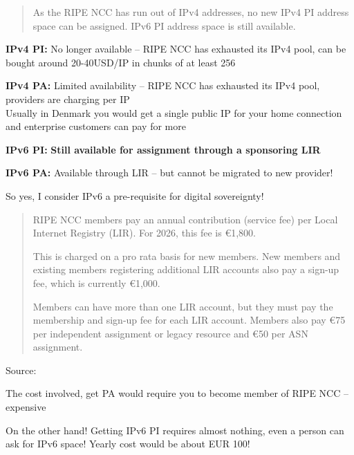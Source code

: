 \documentclass[Screen16to9,17pt]{foils}
\begin{document}

\begin{quote}
As the RIPE NCC has run out of IPv4 addresses, no new IPv4 PI address space can be
assigned. IPv6 PI address space is still available.
\end{quote}

\begin{list2}
  \item {\bf IPv4 PI:} No longer available -- RIPE NCC has exhausted its IPv4 pool, can be bought around 20-40USD/IP in chunks of at least 256
  \item {\bf IPv4 PA:} Limited availability -- RIPE NCC has exhausted its IPv4 pool, providers are charging per IP\\
  Usually in Denmark you would get a single public IP for your home connection and enterprise customers can pay for more
  \item {\bf IPv6 PI:} {\bf Still available for assignment through a sponsoring LIR}
  \item {\bf IPv6 PA:} Available through LIR -- but cannot be migrated to new provider!
\end{list2}

So yes, I consider IPv6 a pre-requisite for digital sovereignty!


\begin{quote}
RIPE NCC members pay an annual contribution (service fee) per Local Internet Registry (LIR). For 2026, this fee is €1,800.

This is charged on a pro rata basis for new members. New members and existing members registering additional LIR accounts also pay a sign-up fee, which is currently €1,000.

Members can have more than one LIR account, but they must pay the membership and sign-up fee for each LIR account. Members also pay €75 per independent assignment or legacy resource and €50 per ASN assignment.
\end{quote}
Source: 

\begin{list2}
\item The cost involved, get PA would require you to become member of RIPE NCC -- expensive
\item On the other hand! Getting IPv6 PI requires almost nothing, even a person can ask for IPv6 space! Yearly cost would be about EUR 100!
\end{list2}
\end{document}
